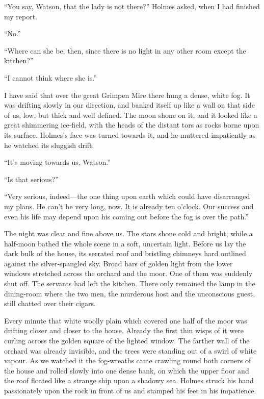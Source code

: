 \documentclass[paper=a5,BCOR=7mm,twoside,DIV=calc,12pt,usegeometry,openany,chapterprefix,endperiod,headings=big]{scrbook} %
\begin{document}
\enquote{You say, Watson, that the lady is not there?} Holmes asked, when I had finished my report.

\enquote{No.}

\enquote{Where can she be, then, since there is no light in any other room except the kitchen?}

\enquote{I cannot think where she is.}

I have said that over the great Grimpen Mire there hung a dense, white fog. It was drifting slowly in our direction, and banked itself up like a wall on that side of us, low, but thick and well defined. The moon shone on it, and it looked like a great shimmering ice-field, with the heads of the distant tors as rocks borne upon its surface. Holmes's face was turned towards it, and he muttered impatiently as he watched its sluggish drift.

\enquote{It's moving towards us, Watson.}

\enquote{Is that serious?}

\enquote{Very serious, indeed---the one thing upon earth which could have disarranged my plans. He can't be very long, now. It is already ten o'clock. Our success and even his life may depend upon his coming out before the fog is over the path.}

The night was clear and fine above us. The stars shone cold and bright, while a half-moon bathed the whole scene in a soft, uncertain light. Before us lay the dark bulk of the house, its serrated roof and bristling chimneys hard outlined against the silver-spangled sky. Broad bars of golden light from the lower windows stretched across the orchard and the moor. One of them was suddenly shut off. The servants had left the kitchen. There only remained the lamp in the dining-room where the two men, the murderous host and the unconscious guest, still chatted over their cigars.

Every minute that white woolly plain which covered one half of the moor was drifting closer and closer to the house. Already the first thin wisps of it were curling across the golden square of the lighted window. The farther wall of the orchard was already invisible, and the trees were standing out of a swirl of white vapour. As we watched it the fog-wreaths came crawling round both corners of the house and rolled slowly into one dense bank, on which the upper floor and the roof floated like a strange ship upon a shadowy sea. Holmes struck his hand passionately upon the rock in front of us and stamped his feet in his impatience.
\end{document}
